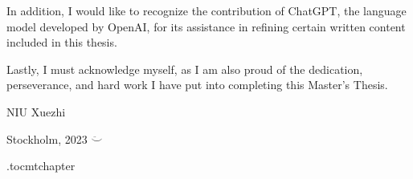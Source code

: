 In addition, I would like to recognize the contribution of ChatGPT, the language model developed by OpenAI, for its assistance in refining certain written content included in this thesis.

Lastly, I must acknowledge myself, as I am also proud of the dedication, perseverance, and hard work I have put into completing this Master's Thesis.

\vspace{2cm}
\hfill NIU Xuezhi 

\hfill Stockholm, \monthname{ }2023 $\ddot\smile$

\newpage



\newpage

\etocdepthtag.toc{mtchapter}

\tableofcontents
\thispagestyle{plain}
\newpage
